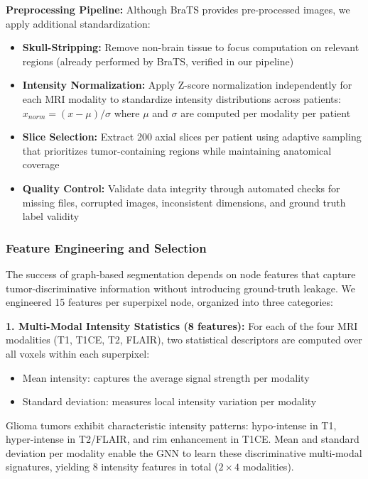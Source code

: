 \textbf{Preprocessing Pipeline:} Although BraTS provides pre-processed images, we apply additional standardization:

\begin{itemize}
    \item \textbf{Skull-Stripping:} Remove non-brain tissue to focus computation on relevant regions (already performed by BraTS, verified in our pipeline)
    
    \item \textbf{Intensity Normalization:} Apply Z-score normalization independently for each MRI modality to standardize intensity distributions across patients: $x_{norm} = (x - \mu) / \sigma$ where $\mu$ and $\sigma$ are computed per modality per patient
    
    \item \textbf{Slice Selection:} Extract 200 axial slices per patient using adaptive sampling that prioritizes tumor-containing regions while maintaining anatomical coverage
    
    \item \textbf{Quality Control:} Validate data integrity through automated checks for missing files, corrupted images, inconsistent dimensions, and ground truth label validity
\end{itemize}

\subsubsection{Feature Engineering and Selection}

The success of graph-based segmentation depends on node features that capture tumor-discriminative information without introducing ground-truth leakage. We engineered 15 features per superpixel node, organized into three categories:

\textbf{1. Multi-Modal Intensity Statistics (8 features):} For each of the four MRI modalities (T1, T1CE, T2, FLAIR), two statistical descriptors are computed over all voxels within each superpixel:
\begin{itemize}
    \item Mean intensity: captures the average signal strength per modality
    \item Standard deviation: measures local intensity variation per modality
\end{itemize}

Glioma tumors exhibit characteristic intensity patterns: hypo-intense in T1, hyper-intense in T2/FLAIR, and rim enhancement in T1CE. Mean and standard deviation per modality enable the GNN to learn these discriminative multi-modal signatures, yielding 8 intensity features in total ($2 \times 4$ modalities).

